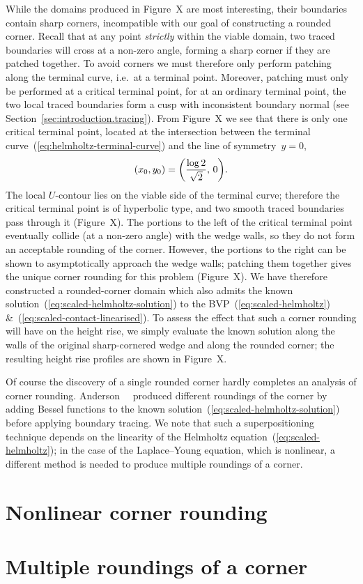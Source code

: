 While the domains produced in Figure~X
are most interesting,
their boundaries contain sharp corners,
incompatible with our goal of constructing a rounded corner.
Recall that at any point \emph{strictly} within the viable domain,
two traced boundaries will cross at a non-zero angle,
forming a sharp corner if they are patched together.
To avoid corners we must therefore only perform patching
along the terminal curve, i.e.~at a terminal point.
Moreover, patching must only be performed at a critical terminal point,
for at an ordinary terminal point,
the two local traced boundaries form a cusp with inconsistent boundary normal
(see Section~\ref{sec:introduction.tracing}).
From Figure~X
we see that there is only one critical terminal point,
located at the intersection between
the terminal curve~(\ref{eq:helmholtz-terminal-curve})
and the line of symmetry~$y = 0$,
\begin{equation}
  (x_0, y_0) = \roundbr*{\frac{\log 2}{\sqrt{2}}, \, 0}.
  \label{eq:helmholtz-critical-terminal-point}
\end{equation}
The local $U$-contour lies on the viable side of the terminal curve;
therefore the critical terminal point is of hyperbolic type,
and two smooth traced boundaries pass through it
(Figure~X). %
The portions to the left of the critical terminal point
eventually collide (at a non-zero angle) with the wedge walls,
so they do not form an acceptable rounding of the corner.
However, the portions to the right
can be shown to asymptotically approach the wedge walls;
patching them together gives the unique corner rounding
for this problem (Figure~X). %
We have therefore constructed a rounded-corner domain
which also admits the known solution~(\ref{eq:scaled-helmholtz-solution})
to the BVP~(\ref{eq:scaled-helmholtz})
\&~(\ref{eq:scaled-contact-linearised}).
To assess the effect that such a corner rounding will have
on the height rise,
we simply evaluate the known solution
along the walls of the original sharp-cornered wedge
and along the rounded corner;
the resulting height rise profiles are shown in
Figure~X. %

Of course the discovery of a single rounded corner
hardly completes an analysis of corner rounding.
Anderson~\etal~\cite{anderson-2007-boundary-tracing-ii-applications}
produced different roundings of the corner
by adding Bessel functions
to the known solution~(\ref{eq:scaled-helmholtz-solution})
before applying boundary tracing.
We note that such a superpositioning technique depends on
the linearity of the Helmholtz equation~(\ref{eq:scaled-helmholtz});
in the case of the Laplace--Young equation, which is nonlinear,
a different method is needed to produce multiple roundings of a corner.

\section{Nonlinear corner rounding}
\label{sec:moderate.rounding}

\section{Multiple roundings of a corner}
\label{sec:moderate.multiple}
